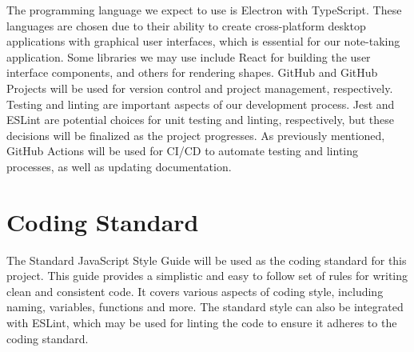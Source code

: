 \documentclass{article}
\begin{document}


The programming language we expect to use is Electron with TypeScript. These languages are chosen due to their ability to create cross-platform 
desktop applications with graphical user interfaces, which is essential for our note-taking application. Some libraries we may use include React 
for building the user interface components, and others for rendering shapes. GitHub and GitHub Projects will be used for version control and 
project management, respectively. Testing and linting are important aspects of our development process. Jest and ESLint are potential choices 
for unit testing and linting, respectively, but these decisions will be finalized as the project progresses. As previously mentioned, GitHub 
Actions will be used for CI/CD to automate testing and linting processes, as well as updating documentation.

\section{Coding Standard}


The Standard JavaScript Style Guide will be used as the coding standard for this project. This guide provides a simplistic and easy to follow
set of rules for writing clean and consistent code. It covers various aspects of coding style, including naming, variables, functions and more.
The standard style can also be integrated with ESLint, which may be used for linting the code to ensure it adheres to the coding standard.
\end{document}

